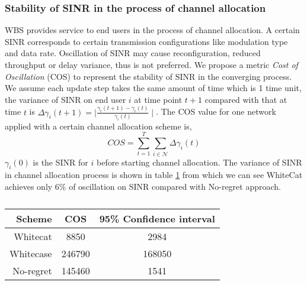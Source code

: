 \subsubsection*{Stability of SINR in the process of channel allocation}
WBS provides service to end users in the process of channel allocation. 
A certain SINR corresponds to certain transmission configurations like modulation type and data rate. Oscillation of SINR may cause reconfiguration, reduced throughput or delay variance, thus is not preferred. We propose a metric \textit{Cost of Oscillation} (COS) to represent the stability of SINR in the converging process. We assume each update step takes the same amount of time which is 1 time unit, the variance of SINR on end user $i$ at time point $t+1$ compared with that at time $t$ is $\varDelta  \gamma_i(t+1)=\mid\frac{\gamma_i(t+1)-\gamma_i(t)}{\gamma_i(t)} \mid$. The COS value for one network applied with a certain channel allocation scheme is,
\begin{equation}
\label{cos}
			COS = \sum\limits_{t=1}^T   \sum\limits_{i\in \mathcal{N}} \varDelta  \gamma_i(t)
			\end{equation}
$\gamma_i(0)$ is the SINR for $i$ before starting channel allocation. The variance of SINR in channel allocation process is shown in table \ref{costable} from which we can see WhiteCat achieves only 6\% of oscillation on SINR compared with No-regret approach.
\begin{table}[!h]
\caption{}\label{costable}
\centering
\begin{tabular}{|r|c|c|}
  \hline
  Scheme			 						& COS 					& 95\% Confidence interval\\
    \hline
  Whitecat									& 8850					& 2984\\
  Whitecase 								& 246790 				& 168050\\ %
  No-regret									& 145460				& 1541\\
  \hline
\end{tabular}
\end{table}



